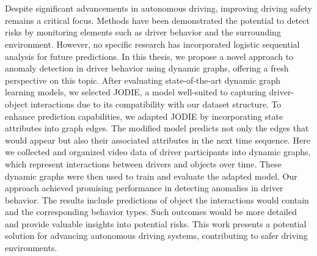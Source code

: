 \chapter{\abstractname}

Despite significant advancements in autonomous driving, improving driving safety remains a critical focus. Methods have been demonstrated the potential to detect risks by monitoring elements such as driver behavior and the surrounding environment. However, no specific research has incorporated logistic sequential analysis for future predictions. In this thesis, we propose a novel approach to anomaly detection in driver behavior using dynamic graphs, offering a fresh perspective on this topic. After evaluating state-of-the-art dynamic graph learning models, we selected JODIE, a model well-suited to capturing driver-object interactions due to its compatibility with our dataset structure. To enhance prediction capabilities, we adapted JODIE by incorporating state attributes into graph edges. The modified model predicts not only the edges that would appear but also their associated attributes in the next time sequence. Here we collected and organized video data of driver participants into dynamic graphs, which represent interactions between drivers and objects over time. These dynamic graphs were then used to train and evaluate the adapted model. Our approach achieved promising performance in detecting anomalies in driver behavior. The results include predictions of object the interactions would contain and the corresponding behavior types. Such outcomes would be more detailed and provide valuable insights into potential risks. This work presents a potential solution for advancing autonomous driving systems, contributing to safer driving environments.



\makeatletter
{}
{\renewcommand{\abstractname}{Kurzfassung}}
{\renewcommand{\abstractname}{Abstract}}
\makeatother

\chapter{\abstractname}


